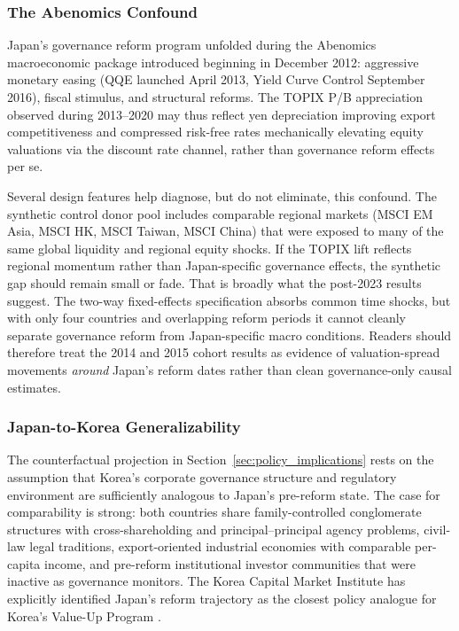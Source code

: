 \documentclass[12pt]{article}
\begin{document}
\subsubsection{The Abenomics Confound}

Japan's governance reform program unfolded during the Abenomics macroeconomic package
introduced beginning in December 2012: aggressive monetary easing (QQE launched April 2013,
Yield Curve Control September 2016), fiscal stimulus, and structural reforms. The TOPIX P/B
appreciation observed during 2013--2020 may thus reflect yen depreciation improving export
competitiveness and compressed risk-free rates mechanically elevating equity valuations via
the discount rate channel, rather than governance reform effects per se.

Several design features help diagnose, but do not eliminate, this confound. The synthetic
control donor pool includes comparable regional markets (MSCI EM Asia, MSCI HK, MSCI Taiwan,
MSCI China) that were exposed to many of the same global liquidity and regional equity shocks.
If the TOPIX lift reflects regional momentum rather than Japan-specific governance effects,
the synthetic gap should remain small or fade. That is broadly what the post-2023 results
suggest. The two-way fixed-effects specification absorbs common time shocks, but with only
four countries and overlapping reform periods it cannot cleanly separate governance reform
from Japan-specific macro conditions. Readers should therefore treat the 2014 and 2015 cohort
results as evidence of valuation-spread movements \textit{around} Japan's reform dates rather
than clean governance-only causal estimates.

\subsubsection{Japan-to-Korea Generalizability}

The counterfactual projection in Section~\ref{sec:policy_implications} rests on the assumption
that Korea's corporate governance structure and regulatory environment are sufficiently
analogous to Japan's pre-reform state. The case for comparability is strong: both countries
share family-controlled conglomerate structures with cross-shareholding and principal--principal
agency problems, civil-law legal traditions, export-oriented industrial economies with
comparable per-capita income, and pre-reform institutional investor communities that were
inactive as governance monitors. The Korea Capital Market Institute has explicitly identified
Japan's reform trajectory as the closest policy analogue for Korea's Value-Up Program
\citep{kcmi2023}.
\end{document}
